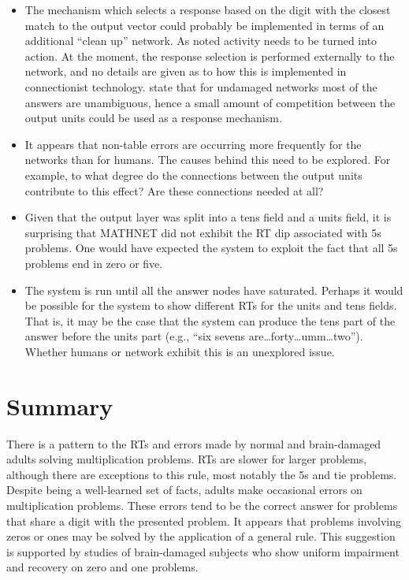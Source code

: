 \begin{itemize}

\item The mechanism which selects a response based on
the digit with the closest
match to the output vector could probably be implemented in terms of an
additional ``clean up'' network.  As noted
activity needs to be turned into action.  At the moment, the
response selection is performed externally to the network, and no details
are given as to how this is implemented in connectionist technology.
\citeauthor{mcclmath} state that for undamaged networks most of the answers
are unambiguous, hence a small amount of competition between the output
units could be used as a response mechanism.

\item  It appears that non-table errors are occurring more
frequently for the networks than for humans.  The causes behind this need
to be explored. For example, to what degree do the connections between the
output units contribute to this effect?  Are these connections needed at
all?

\item Given that the output layer was split into a tens field and
a units field, it is surprising that MATHNET did not exhibit the RT dip
associated with 5s problems.  One would have expected the system to exploit
the fact that all 5s problems end in zero or five.

\item The system is run until all the answer nodes
have saturated.  Perhaps it would be possible for the system to show
different RTs for the units and tens fields.  That is, it may be the case
that the system can produce the tens part of the answer before the units
part (e.g., ``six sevens are\ldots forty\ldots umm\ldots two'').
Whether
humans or network exhibit this is an unexplored issue.

\end{itemize}


\section{Summary}

There is a pattern to the RTs and errors made by normal and brain-damaged
adults solving multiplication problems. RTs are slower for
larger problems, although there are exceptions to this rule, most notably
the 5s and tie problems. Despite being a well-learned set of facts, adults
make occasional errors on multiplication problems. These errors tend to be
the correct answer
for problems that share a digit with the presented problem. It
appears that problems involving zeros or ones
may be solved by the
application of a general rule. This suggestion is supported by studies of
brain-damaged subjects who show uniform impairment and recovery on zero and
one problems.

